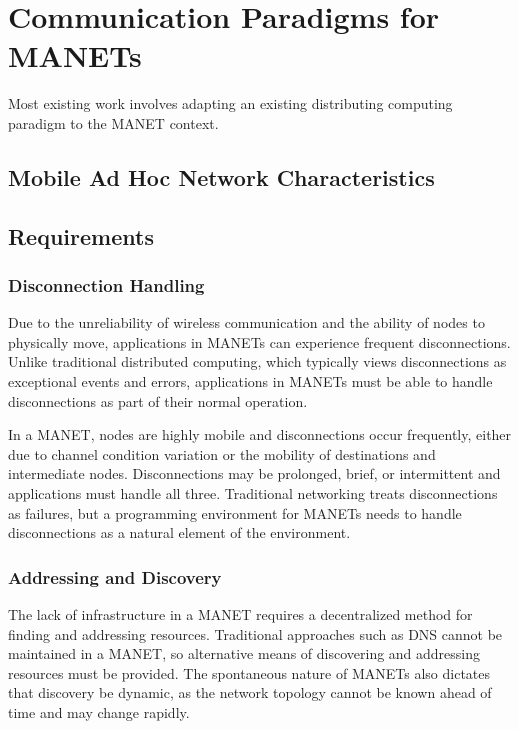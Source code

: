 \chapter{Communication Paradigms for MANETs}

Most existing work involves adapting an existing distributing computing paradigm to the MANET context.

\section{Mobile Ad Hoc Network Characteristics}

\section{Requirements}

\subsection{Disconnection Handling}

Due to the unreliability of wireless communication and the ability of nodes to physically move, applications in MANETs can experience frequent disconnections.
Unlike traditional distributed computing, which typically views disconnections as exceptional events and errors, applications in MANETs must be able to handle disconnections as part of their normal operation.

In a MANET, nodes are highly mobile and disconnections occur frequently, either due to channel condition variation or the mobility of destinations and intermediate nodes. Disconnections may be prolonged, brief, or intermittent and applications must handle all three. Traditional networking treats disconnections as failures, but a programming environment for MANETs needs to handle disconnections as a natural element of the environment.

\subsection{Addressing and Discovery}

 The lack of infrastructure in a MANET requires a decentralized method for finding and addressing resources. Traditional approaches such as DNS cannot be maintained in a MANET, so alternative means of discovering and addressing resources must be provided. The spontaneous nature of MANETs also dictates that discovery be dynamic, as the network topology cannot be known ahead of time and may change rapidly.


